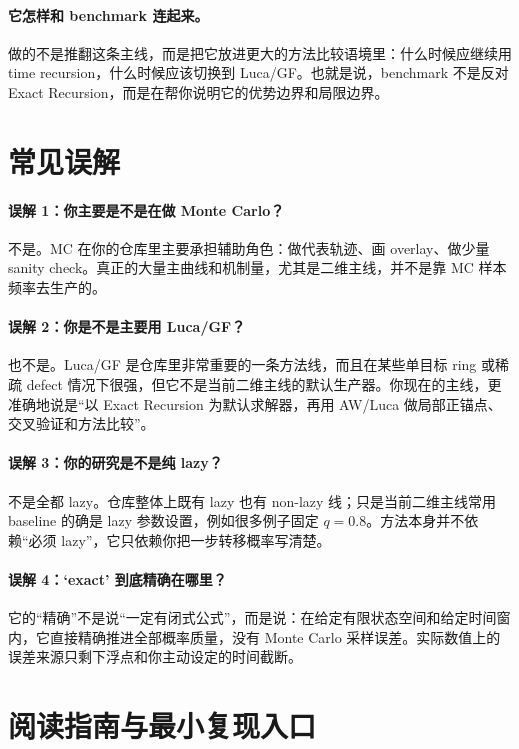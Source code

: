 \documentclass[11pt,fontset=fandol]{ctexart}
\begin{document}
\paragraph{它怎样和 benchmark 连起来。}
 做的不是推翻这条主线，而是把它放进更大的方法比较语境里：什么时候应继续用 time recursion，什么时候应该切换到 Luca/GF。也就是说，benchmark 不是反对 Exact Recursion，而是在帮你说明它的优势边界和局限边界。

\section{常见误解}
\paragraph{误解 1：你主要是不是在做 Monte Carlo？}
不是。MC 在你的仓库里主要承担辅助角色：做代表轨迹、画 overlay、做少量 sanity check。真正的大量主曲线和机制量，尤其是二维主线，并不是靠 MC 样本频率去生产的。

\paragraph{误解 2：你是不是主要用 Luca/GF？}
也不是。Luca/GF 是仓库里非常重要的一条方法线，而且在某些单目标 ring 或稀疏 defect 情况下很强，但它不是当前二维主线的默认生产器。你现在的主线，更准确地说是“以 Exact Recursion 为默认求解器，再用 AW/Luca 做局部正锚点、交叉验证和方法比较”。

\paragraph{误解 3：你的研究是不是纯 lazy？}
不是全都 lazy。仓库整体上既有 lazy 也有 non-lazy 线；只是当前二维主线常用 baseline 的确是 lazy 参数设置，例如很多例子固定 $q=0.8$。方法本身并不依赖“必须 lazy”，它只依赖你把一步转移概率写清楚。

\paragraph{误解 4：`exact' 到底精确在哪里？}
它的“精确”不是说“一定有闭式公式”，而是说：在给定有限状态空间和给定时间窗内，它直接精确推进全部概率质量，没有 Monte Carlo 采样误差。实际数值上的误差来源只剩下浮点和你主动设定的时间截断。

\section{阅读指南与最小复现入口}
\end{document}
